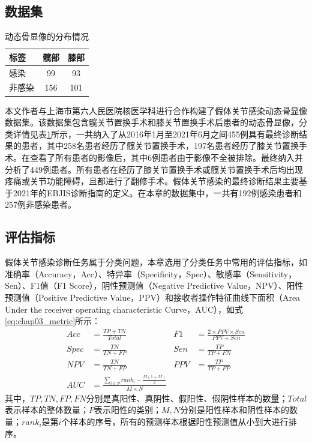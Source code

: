 \subsection{数据集}

\begin{table}[htbp]
  \centering
  \caption{动态骨显像的分布情况}
  \begin{tabular}{lcc}
    \toprule
    标签   & 髋部 & 膝部 \\
    \midrule
    感染   & 99   & 93   \\
    非感染 & 156  & 101  \\
    \bottomrule
  \end{tabular}
  \label{tab:chap03_dataset}
\end{table}

本文作者与上海市第六人民医院核医学科进行合作构建了假体关节感染动态骨显像数据集。该数据集包含髋关节置换手术和膝关节置换手术后患者的动态骨显像，分类详情见表\ref{tab:chap03_dataset}所示，一共纳入了从2016年1月至2021年6月之间455例具有最终诊断结果的患者，其中258名患者经历了髋关节置换手术，197名患者经历了膝关节置换手术。在查看了所有患者的影像后，其中6例患者由于影像不全被排除。最终纳入并分析了449例患者。所有患者在经历了膝关节置换手术或髋关节置换手术后均出现疼痛或关节功能障碍，且都进行了翻修手术。假体关节感染的最终诊断结果主要基于2021年的EBJIS诊断指南的定义\cite{mcnally2021ebjis}。在本章的数据集中，一共有192例感染患者和257例非感染患者。

\subsection{评估指标}

假体关节感染诊断任务属于分类问题，本章选用了分类任务中常用的评估指标，如准确率（Accuracy，Acc）、特异率（Specificity，Spec）、敏感率（Sensitivity，Sen）、F1值（F1 Score），阴性预测值（Negative Predictive Value，NPV）、阳性预测值（Positive Predictive Value，PPV）和接收者操作特征曲线下面积（Area Under the receiver operating characteristic Curve，AUC），如式\ref{eq:chap03_metric}所示：
\begin{equation}
  \begin{aligned}
    Acc  & = \frac{TP+TN}{Total}                                         & F1  & = \frac{2 \times PPV \times Sen}{PPV + Sen} \\
    Spec & = \frac{TN}{TN+FP}                                            & Sen & = \frac{TP}{TP+FN}                          \\
    NPV  & = \frac{TN}{TN+FP}                                            & PPV & = \frac{TP}{TP+FP}                          \\
    AUC  & = \frac{\sum_{i \in P} rank_i - \frac{M(1+M)}{2}}{M \times N} &     &
  \end{aligned}
  \label{eq:chap03_metric}
\end{equation}
其中，\(TP,TN,FP,FN\)分别是真阳性、真阴性、假阳性、假阴性样本的数量；\(Total\)表示样本的整体数量；\(P\)表示阳性的类别；\(M,N\)分别是阳性样本和阴性样本的数量；\(rank_i\)是第\(i\)个样本的序号，所有的预测样本根据阳性预测值从小到大进行排序。

